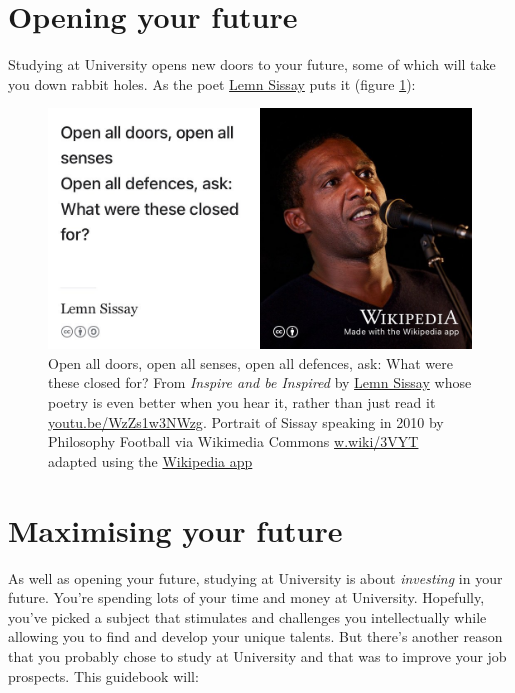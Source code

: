 \documentclass[
]{book}
\begin{document}
\hypertarget{opening}{%
\section{Opening your future}\label{opening}}

Studying at University opens new doors to your future, some of which will take you down rabbit holes. As the poet \href{https://en.wikipedia.org/wiki/Lemn_Sissay}{Lemn Sissay} puts it (figure \ref{fig:lemn-fig}):

\begin{figure}

{\centering \includegraphics[width=0.99\linewidth]{images/lemninspire} 

}

\caption{Open all doors, open all senses, open all defences, ask: What were these closed for? From \emph{Inspire and be Inspired} by \href{https://en.wikipedia.org/wiki/Lemn_Sissay}{Lemn Sissay} whose poetry is even better when you hear it, rather than just read it \href{https://youtu.be/WzZs1w3NWzg}{youtu.be/WzZs1w3NWzg}. \citep{sissay} Portrait of Sissay speaking in 2010 by Philosophy Football via Wikimedia Commons \href{https://w.wiki/3VYT}{w.wiki/3VYT} adapted using the \href{https://apps.apple.com/gb/app/wikipedia/id324715238}{Wikipedia app}}\label{fig:lemn-fig}
\end{figure}



\hypertarget{roi}{%
\section{Maximising your future}\label{roi}}

As well as opening your future, studying at University is about \emph{investing} in your future. You're spending lots of your time and money at University. Hopefully, you've picked a subject that stimulates and challenges you intellectually while allowing you to find and develop your unique talents. But there's another reason that you probably chose to study at University and that was to improve your job prospects. This guidebook will:
\end{document}
